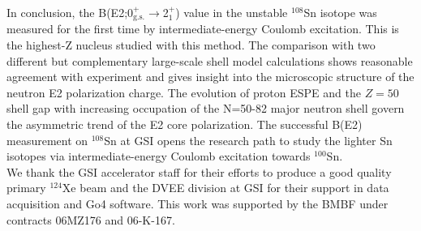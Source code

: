 \documentclass[prc,twocolumn,amssymb,amsmath,showpacs,superscriptaddress]{revtex4}
\begin{document}
In conclusion, the B(E2;0$^+_{\text{g.s.}}$$\to$2$^{+}_1$) value
in the unstable $^{108}$Sn isotope was measured for the first time
by intermediate-energy Coulomb excitation. This is the highest-Z
nucleus studied with this method. The comparison with two
different but complementary large-scale shell model calculations
shows reasonable agreement with experiment and gives insight into
the microscopic structure of the neutron E2 polarization charge.
The evolution of proton ESPE and the $Z=50$ shell gap with
increasing occupation of the N=50-82 major neutron shell govern
the asymmetric trend of the E2 core polarization. The successful
B(E2) measurement on $^{108}$Sn at GSI opens the research path to
study the lighter Sn isotopes via intermediate-energy Coulomb
excitation towards
$^{100}$Sn.\\

We thank the GSI accelerator staff for their efforts to produce a
good quality primary $^{124}$Xe beam and the DVEE division at GSI
for their support in data acquisition and Go4 software. This work
was supported by the BMBF under contracts 06MZ176 and 06-K-167.
\end{document}
